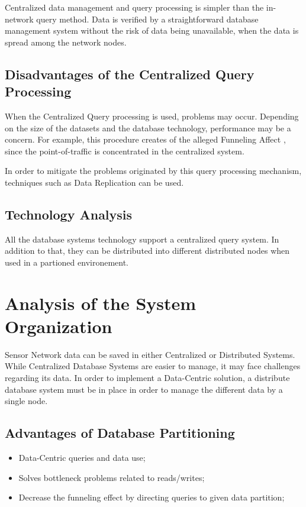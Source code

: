 Centralized data management and query processing is simpler than the in-network
query method. Data is verified by a straightforward database management system
without the risk of data being unavailable, when the data is spread among the
network nodes.

\subsection{Disadvantages of the Centralized Query Processing}

When the Centralized Query processing is used, problems may occur. Depending on
the size of the datasets and the database technology, performance may be a
concern. For example, this procedure creates of the alleged Funneling Affect
\cite{sn-storage04}, since the point-of-traffic is concentrated in the
centralized system.

In order to mitigate the problems originated by this query processing
mechanism, techniques such as Data Replication can be used.

\subsection{Technology Analysis}

All the database systems technology support a centralized query system. In
addition to that, they can be distributed into different distributed nodes when
used in a partioned environement.

\section{Analysis of the System Organization}

Sensor Network data can be saved in either Centralized or Distributed Systems.
While Centralized Database Systems are easier to manage, it may
face challenges regarding its data. In order to implement a Data-Centric
solution, a distribute database system must be in place in order to manage
the different data by a single node.

\subsection{Advantages of Database Partitioning}

\begin{itemize}
  \item Data-Centric queries and data use;
  \item Solves bottleneck problems related to reads/writes;
  \item Decrease the funneling effect by directing queries to given data
  partition;
\end{itemize}

